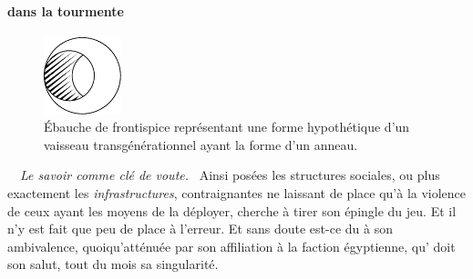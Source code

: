 \paragraph{\elena{} dans la tourmente}
\begin{figure}
	\vspace{-1em}
	\centering
	\includegraphics[width=0.2\textwidth]{frontispice-arche-evidee.pdf}
	\caption{Ébauche de frontispice représentant une forme hypothétique d’un vaisseau transgénérationnel ayant la forme d’un anneau.}
	\vspace{-10pt}
\end{figure}
\
\
{\em\normalsize Le savoir comme clé de voute.}~
Ainsi posées les structures sociales, ou plus exactement les \emph{infrastructures}, contraignantes ne laissant de place qu’à la violence de ceux ayant les moyens de la déployer, \elena{} cherche à tirer son épingle du jeu.
Et il n’y est fait que peu de place à l’erreur. Et sans doute est-ce du à son ambivalence, quoiqu’atténuée par son affiliation à la faction égyptienne, qu’\elena{}  doit son salut, tout du mois sa singularité.

